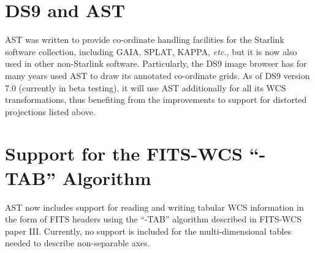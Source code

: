 \documentclass[11pt,twoside]{article}
\begin{document}
\section{DS9 and AST}
AST was written to provide co-ordinate handling facilities for the
Starlink software collection, including GAIA, SPLAT, KAPPA, \emph{etc.},
but it is now also used in other non-Starlink software. Particularly, the
DS9 image browser \citep{DS9} has for many years used AST to draw its
annotated co-ordinate grids. As of DS9 version 7.0 (currently in beta
testing), it will use AST additionally for all its WCS transformations,
thus benefiting from the improvements to support for distorted
projections listed above.

\section{Support for the FITS-WCS ``-TAB'' Algorithm}
AST now includes support for reading and writing tabular WCS information
in the form of FITS headers using the ``-TAB'' algorithm described in
FITS-WCS paper III. Currently, no support is included for the
multi-dimensional tables needed to describe non-separable axes.



\end{document}
